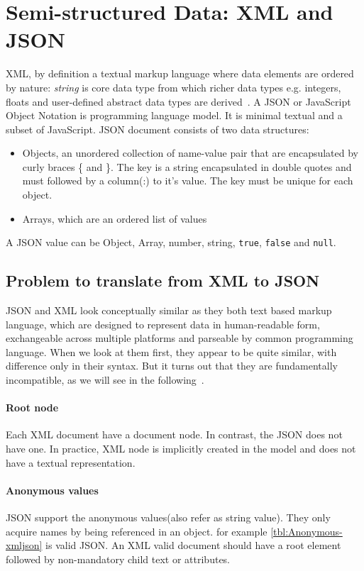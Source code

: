 \documentclass[a4paper,12pt]{article}
\begin{document}
\section{Semi-structured Data: XML and JSON}
		XML, by definition a textual markup language where data elements are ordered by nature: \textit{string} is core data type from which richer data types e.g. integers, floats and user-defined abstract data types are derived~\citep{xmark/original}.
		A JSON or JavaScript Object Notation is programming language model. It is minimal textual and a subset of JavaScript. JSON document consists of two data structures:
		\begin{itemize}
			\item Objects, an unordered collection of name-value pair that are encapsulated by curly braces \{ and \}. The key is a string encapsulated in double quotes and must followed by a column(:) to it's value. The key must be unique for each object.
			\item Arrays, which are an ordered list of values
		\end{itemize}
		A JSON value can be Object, Array, number, string, \texttt{true}, \texttt{false} and \texttt{null}.
		\subsection{Problem to translate from XML to JSON}
		JSON and XML look conceptually similar as they both text based markup language, which are designed to represent data in human-readable form, exchangeable across multiple platforms and parseable by common programming language. When we look at them first, they appear to be quite similar, with difference only in their syntax. But it turns out that they are fundamentally incompatible, as we will see in the following~\citep{lee2011jxon}.
		
		\paragraph{Root node}
		Each XML document have a document node. In contrast, the JSON does not have one. In practice, XML node is implicitly created in the model and does not have a textual representation.
		\paragraph{Anonymous values}
		JSON support the anonymous values(also refer as string value). They only acquire names by being referenced in an object. for example \ref{tbl:Anonymous-xmljson} is valid JSON. An XML valid document should have a root element followed by  non-mandatory child text or attributes.
		
\end{document}
